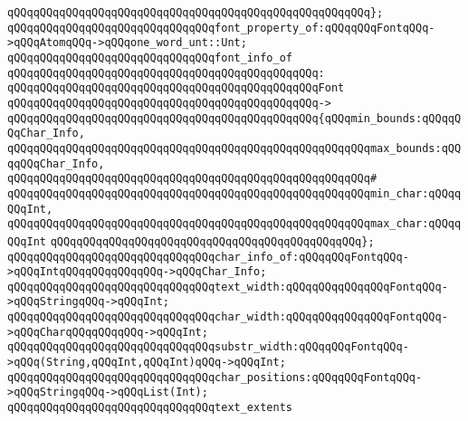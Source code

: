 \verb|qQQqqQQqqQQqqQQqqQQqqQQqqQQqqQQqqQQqqQQqqQQqqQQqqQQqqQQq};|\newline
\newline
\verb|qQQqqQQqqQQqqQQqqQQqqQQqqQQqqQQqfont_property_of:qQQqqQQqFontqQQq->qQQqAtomqQQq->qQQqone_word_unt::Unt;|\newline
\newline
\verb|qQQqqQQqqQQqqQQqqQQqqQQqqQQqqQQqfont_info_of|\newline
\verb|qQQqqQQqqQQqqQQqqQQqqQQqqQQqqQQqqQQqqQQqqQQqqQQq:|\newline
\verb|qQQqqQQqqQQqqQQqqQQqqQQqqQQqqQQqqQQqqQQqqQQqqQQqFont|\newline
\verb|qQQqqQQqqQQqqQQqqQQqqQQqqQQqqQQqqQQqqQQqqQQqqQQq->|\newline
\verb|qQQqqQQqqQQqqQQqqQQqqQQqqQQqqQQqqQQqqQQqqQQqqQQq{qQQqmin_bounds:qQQqqQQqChar_Info,|\newline
\verb|qQQqqQQqqQQqqQQqqQQqqQQqqQQqqQQqqQQqqQQqqQQqqQQqqQQqqQQqmax_bounds:qQQqqQQqChar_Info,|\newline
\verb|qQQqqQQqqQQqqQQqqQQqqQQqqQQqqQQqqQQqqQQqqQQqqQQqqQQqqQQq#|\newline
\verb|qQQqqQQqqQQqqQQqqQQqqQQqqQQqqQQqqQQqqQQqqQQqqQQqqQQqqQQqmin_char:qQQqqQQqInt,|\newline
\verb|qQQqqQQqqQQqqQQqqQQqqQQqqQQqqQQqqQQqqQQqqQQqqQQqqQQqqQQqmax_char:qQQqqQQqInt|\newline
\verb|qQQqqQQqqQQqqQQqqQQqqQQqqQQqqQQqqQQqqQQqqQQqqQQq};|\newline
\newline
\verb|qQQqqQQqqQQqqQQqqQQqqQQqqQQqqQQqchar_info_of:qQQqqQQqFontqQQq->qQQqIntqQQqqQQqqQQqqQQq->qQQqChar_Info;|\newline
\verb|qQQqqQQqqQQqqQQqqQQqqQQqqQQqqQQqtext_width:qQQqqQQqqQQqqQQqFontqQQq->qQQqStringqQQq->qQQqInt;|\newline
\verb|qQQqqQQqqQQqqQQqqQQqqQQqqQQqqQQqchar_width:qQQqqQQqqQQqqQQqFontqQQq->qQQqCharqQQqqQQqqQQq->qQQqInt;|\newline
\newline
\verb|qQQqqQQqqQQqqQQqqQQqqQQqqQQqqQQqsubstr_width:qQQqqQQqFontqQQq->qQQq(String,qQQqInt,qQQqInt)qQQq->qQQqInt;|\newline
\newline
\verb|qQQqqQQqqQQqqQQqqQQqqQQqqQQqqQQqchar_positions:qQQqqQQqFontqQQq->qQQqStringqQQq->qQQqList(Int);|\newline
\newline
\verb|qQQqqQQqqQQqqQQqqQQqqQQqqQQqqQQqtext_extents|\newline
